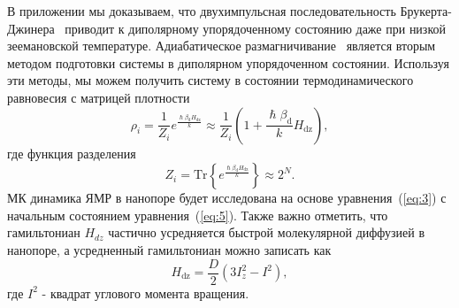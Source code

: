 \documentclass[review]{elsarticle}
\newcommand{\hdz}{H_\mathrm{dz}}
\begin{document}
В приложении мы доказываем, что двухимпульсная последовательность Брукерта-Джинера~\cite{Goldman_1970,Jeener_1967} приводит к диполярному упорядоченному состоянию даже при низкой зеемановской температуре.
Адиабатическое размагничивание~\cite{Goldman_1970,Slichter_1961} является вторым методом подготовки системы в диполярном упорядоченном состоянии.
Используя эти методы, мы можем получить систему в состоянии термодинамического равновесия с матрицей плотности
%
\begin{equation}
    \label{eq:5}
    \rho_i = \frac{1}{Z_i} e^\frac{\hslash\beta_\mathrm{d} \hdz}{k}
    \approx \frac{1}{Z_i}(1 + \frac{\hslash\beta_\mathrm{d}}{k} H_\mathrm{dz}),
\end{equation}
%
где функция разделения
%
\begin{equation}
    \label{eq:6}
	Z_i = \mathrm{Tr} \left\{ e^\frac{\hslash\beta_\mathrm{d} \hdz}{k} \right\} \approx 2^{N}.
\end{equation}
%
МК динамика ЯМР в нанопоре будет исследована на основе уравнения~(\ref{eq:3}) с начальным состоянием уравнения~(\ref{eq:5}).
Также важно отметить, что гамильтониан $H_{dz}$ частично усредняется быстрой молекулярной диффузией в нанопоре, а усредненный гамильтониан можно записать как \cite{Fel_dman_2004,Doronin_2011}
%
\begin{equation}
    \label{eq:7}
    H_\mathrm{dz} = \dfrac{D}{2} (3 I^{2}_{z} - I^{2}) , %
\end{equation}
%
где $I^{2}$ - квадрат углового момента вращения.
\end{document}
